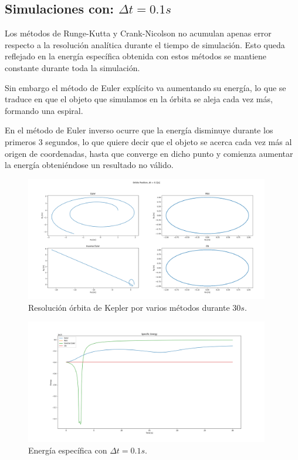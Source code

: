 \documentclass[12pt,a4paper]{article}
\begin{document}
\subsection{Simulaciones con: $\Delta t = 0.1 s$}
Los métodos de Runge-Kutta y Crank-Nicolson no acumulan apenas error respecto a la resolución analítica durante el tiempo de simulación. Esto queda reflejado en la energía específica obtenida con estos métodos se mantiene constante durante toda la simulación. 

Sin embargo el método de Euler explícito va aumentando su energía, lo que se traduce en que el objeto que simulamos en la órbita se aleja cada vez más, formando una espiral. 

En el método de Euler inverso ocurre que la energía disminuye durante los primeros 3 segundos, lo que quiere decir que el objeto se acerca cada vez más al origen de coordenadas, hasta que converge en dicho punto y comienza aumentar la energía obteniéndose un resultado no válido.  
\begin{figure}[H] 
	\centering
	\includegraphics[width=0.95\textwidth]{FIGURES/dt0.1_newton_pos.png}
	\caption{Resolución órbita de Kepler por varios métodos durante 30$s$.}
\end{figure}
\begin{figure}[H] 
	\centering
	\includegraphics[width=0.95\textwidth]{FIGURES/dt0.1_fsolve_energy.png}
	\caption{Energía específica con $\Delta t = 0.1 s$.}
\end{figure}
\end{document}
